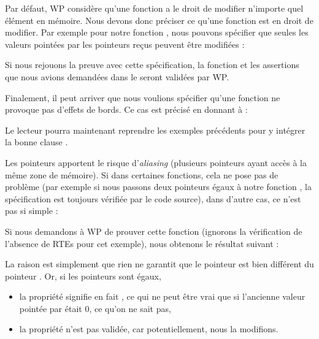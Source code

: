 Par défaut, WP considère qu'une fonction a le droit de modifier n'importe quel
élément en mémoire. Nous devons donc préciser ce qu'une fonction est en droit
de modifier. Par exemple pour notre fonction , nous pouvons
spécifier que seules les valeurs pointées par les pointeurs reçus peuvent être
modifiées :






Si nous rejouons la preuve avec cette spécification, la fonction et les
assertions que nous avions demandées dans le  seront validées par WP.



Finalement, il peut arriver que nous voulions spécifier qu'une fonction ne
provoque pas d'effets de bords. Ce cas est précisé en donnant 
à  :






Le lecteur pourra maintenant reprendre les exemples précédents pour y intégrer
la bonne clause .





Les pointeurs apportent le risque d'\textit{aliasing} (plusieurs pointeurs ayant accès à
la même zone de mémoire). Si dans certaines fonctions, cela ne pose pas de
problème (par exemple si nous passons deux pointeurs égaux
à notre fonction , la spécification est toujours vérifiée par le
code source), dans d'autre cas, ce n'est pas si simple :






Si nous demandons à WP de prouver cette fonction (ignorons la vérification de
l'absence de RTEs pour cet exemple), nous obtenons le résultat suivant :





La raison est simplement que rien ne garantit que le pointeur  est bien
différent du pointeur . Or, si les pointeurs sont égaux,



\begin{itemize}
\item la propriété  signifie en fait
, ce qui ne peut être vrai que si l'ancienne valeur
pointée par  était 0, ce qu'on ne sait pas,
\item la propriété  n'est pas validée, car potentiellement,
nous la modifions.
\end{itemize}


